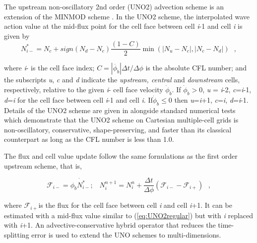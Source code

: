 
\vspace{\baselineskip} 
\vspace{\baselineskip} 


\noindent
The upstream non-oscillatory 2nd order (UNO2) advection scheme
\citep{art:Li08} is an extension of the MINMOD scheme \citep{art:Roe86}. In
the UNO2 scheme, the interpolated wave action value at the mid-flux point for
the cell face between cell \emph{i}-1 and cell \emph{i} is given by
\begin{equation}
N_{i-}^{*}=N_{c}+sign\left(N_{d}-N_{c}\right)\frac{\left(1-C\right)}{2}\min\left(|N_{u}-N_{c}|,|N_{c}-N_{d}|\right) \:\:\: ,
\label{eq:UNO2regular}
\end{equation}

\noindent
where \emph{i}- is the cell face index; $C=\left|\dot{\phi_{b}}\right|\Delta
t/\Delta\phi$ is the absolute CFL number; and the subscripts \emph{u},
\emph{c} and \emph{d} indicate the \emph{upstream, central} and
\emph{downstream} cells, respectively, relative to the given \emph{i}- cell
face velocity $\dot{\phi}_{b}$. If $\dot{\phi}_{b}>0$, \emph{u} = \emph{i}-2,
\emph{c}=\emph{i}-1, \emph{d}=\emph{i} for the cell face between cell
\emph{i}-1 and cell \emph{i}. If$\dot{\phi}_{b}\leq0$ then
\emph{u}=\emph{i}+1, \emph{c}=\emph{i}, \emph{d}=\emph{i}-1. Details of the
UNO2 scheme are given in \cite{art:Li08} alongside standard numerical tests
which demonstrate that the UNO2 scheme on Cartesian multiple-cell grids is
non-oscillatory, conservative, shape-preserving, and faster than its classical
counterpart as long as the CFL number is less than 1.0.

The flux and cell value update follow the same fornulations as the first order
upstream scheme, that is,

\begin{equation}
\mathcal{F}_{i-}=\dot{\phi_{b}N_{i-}^{*}};\;\;\; N_{i}^{n+1}=N_{i}^{n}+\frac{\Delta t}{\Delta\phi}\left(\mathcal{F}_{i-}-\mathcal{F}_{i+}\right) \:\:\: ,
\end{equation}
 
\noindent
where $\mathcal{F}_{i+}$is the flux for the cell face between cell\emph{ i}
and cell \emph{i}+1. It can be estimated with a mid-flux value similar to
(\ref{eq:UNO2regular}) but with \emph{i} replaced with \emph{i}+1.  An
advective-conservative hybrid operator \citep{art:LLM96} that reduces the
time-splitting error is used to extend the UNO schemes to multi-dimensions.

